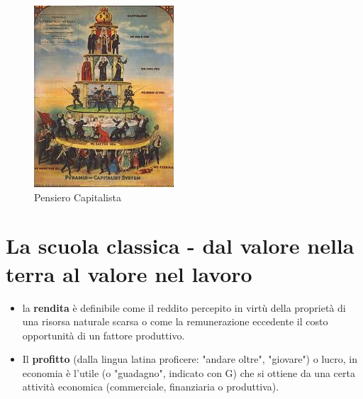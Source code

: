 \documentclass{article}
\begin{document}
\begin{figure}[h!]
\centering
\includegraphics[scale=1.0]{images/fisiocratici.jpeg}
\caption{Pensiero Capitalista}
\label{fig:cap}
\end{figure}


\section{La scuola classica - dal valore nella terra al valore nel lavoro}
\begin{itemize}
    \item  la \textbf{rendita} è definibile come il reddito percepito in virtù della proprietà di una risorsa naturale scarsa o come la remunerazione eccedente il costo opportunità di un fattore produttivo.
    \item Il \textbf{profitto} (dalla lingua latina proficere: "andare oltre", "giovare") o lucro, in economia è l'utile (o "guadagno", indicato con G) che si ottiene da una certa attività economica (commerciale, finanziaria o produttiva).
\end{itemize}
\end{document}
